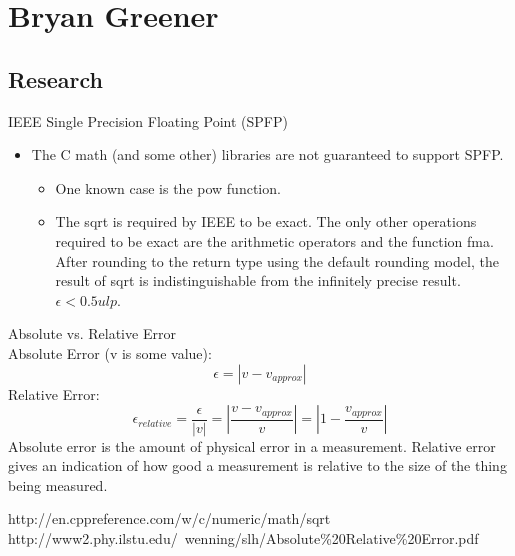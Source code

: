 \documentclass[12pt]{article}
\begin{document}
\section*{Bryan Greener}
\subsection*{Research}
IEEE Single Precision Floating Point (SPFP)\\
\begin{itemize}
	\item The C math (and some other) libraries are not guaranteed to support SPFP.
	\begin{itemize}
		\item One known case is the pow function.
		\item The sqrt is required by IEEE to be exact. The only other operations required to be exact are the arithmetic operators and the function fma. After rounding to the return type using the default rounding model, the result of sqrt is indistinguishable from the infinitely precise result. $\epsilon < 0.5 ulp$.\cite{1}
	\end{itemize}
\end{itemize}
Absolute vs. Relative Error\\
Absolute Error (v is some value):
	\[ \epsilon = |v-v_{approx}| \]
Relative Error:
	\[ \epsilon_{relative} = \frac{\epsilon}{|v|} = |\frac{v-v_{approx}}{v}| = |1-\frac{v_{approx}}{v}| \]
Absolute error is the amount of physical error in a measurement. Relative error gives an indication of how good a measurement is relative to the size of the thing being measured.\cite{2}

\begin{thebibliography}{999}
	http://en.cppreference.com/w/c/numeric/math/sqrt
	http://www2.phy.ilstu.edu/~wenning/slh/Absolute\%20Relative\%20Error.pdf
	
\end{thebibliography}
\end{document}
